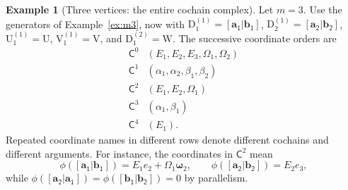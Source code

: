 \documentclass[a4paper,11pt,oneside,reqno]{amsart}
\theoremstyle{definition}
\newtheorem{example}[theorem]{Example}
\numberwithin{equation}{section}
\begin{document}
	\begin{example}[Three vertices: the entire cochain complex]
		\label{ex:HH-m3}
		Let $m=3$.  Use the generators of Example~\ref{ex:m3}, now with
		$\mathrm{D}_1^{(1)}=\mathsf{[\mathbf{a}_1|\mathbf{b}_1]}$, $\mathrm{D}_2^{(1)}=\mathsf{[\mathbf{a}_2|\mathbf{b}_2]}$,
		$\mathrm{U}_1^{(1)}=\mathrm{U}$, $\mathrm{V}_1^{(1)}=\mathrm{V}$, and $\mathrm{D}_1^{(2)}=\mathrm{W}$.
		The successive coordinate orders are
		\[
		\begin{array}{c|l}
			\mathsf C^0&(E_1,E_2,E_3,\Omega_1,\Omega_2)\\
			\mathsf C^1&(\alpha_1,\alpha_2,\beta_1,\beta_2)\\
			\mathsf C^2&(E_1,E_2,\Omega_1)\\
			\mathsf C^3&(\alpha_1,\beta_1)\\
			\mathsf C^4&(E_1).
		\end{array}
		\]
		Repeated coordinate names in different rows denote different cochains
		and different arguments.  For instance, the coordinates in $\mathsf C^2$ mean
		\[
		\phi(\mathsf{[\mathbf{a}_1|\mathbf{b}_1]})=E_1e_2+\Omega_1\boldsymbol{\omega}_2,
		\qquad \phi(\mathsf{[\mathbf{a}_2|\mathbf{b}_2]})=E_2e_3,
		\]
		while $\phi(\mathsf{[\mathbf{a}_2|\mathbf{a}_1]})=\phi(\mathsf{[\mathbf{b}_1|\mathbf{b}_2]})=0$ by parallelism.
		

\end{example}
\end{document}
